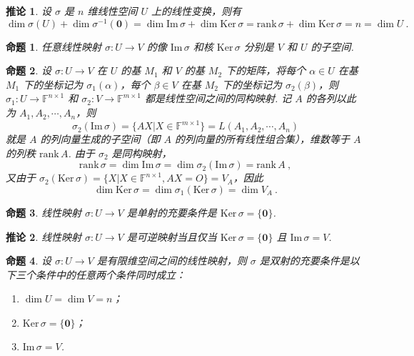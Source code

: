 \documentclass[zihao=-4,UTF8,linespread=1.8,nothm]{aytony_base}
\newtheorem{proposition}{\indent 命题}[subsection]
\newtheorem*{corollary}{\indent 推论}
\begin{document}
\begin{corollary}
    设 $\sigma$ 是 $n$ 维线性空间 $U$ 上的线性变换，则有 $$
        \dim \sigma(U) + \dim \sigma^{-1}(\mathbf{0}) = \dim \mathrm{Im}\,\sigma + \dim \mathrm{Ker}\,\sigma = \mathrm{rank}\,\sigma + \dim \mathrm{Ker}\,\sigma = n = \dim U\ .
    $$
\end{corollary}

\begin{proposition}
    任意线性映射 $\sigma: U \to V$ 的像 $\mathrm{Im}\,\sigma$ 和核 $\mathrm{Ker}\,\sigma$ 分别是 $V$ 和 $U$ 的子空间.
\end{proposition}

\begin{proposition}
    设 $\sigma: U \to V$ 在 $U$ 的基 $M_1$ 和 $V$ 的基 $M_2$ 下的矩阵，将每个 $\alpha \in U$ 在基 $M_1$ 下的坐标记为 $\sigma_1(\alpha)$，每个 $\beta \in V$ 在基 $M_2$ 下的坐标记为 $\sigma_2(\beta)$，则 $\sigma_1:U \to \mathbb{F}^{n \times 1}$ 和 $\sigma_2:V \to \mathbb{F}^{m \times 1}$ 都是线性空间之间的同构映射. 记 $A$ 的各列以此为 ${A}_1, {A}_2, \cdots, {A}_{n}$，则 $$
        \sigma_2(\mathrm{Im}\,\sigma) = \{AX|X \in \mathbb{F}^{m \times 1}\} = L({A}_1, {A}_2, \cdots, {A}_{n})
    $$ 就是 $A$ 的列向量生成的子空间（即 $A$ 的列向量的所有线性组合集），维数等于 $A$ 的列秩 $\mathrm{rank}\,A$. 由于 $\sigma_2$ 是同构映射，$$
        \mathrm{rank}\,\sigma = \dim \mathrm{Im}\,\sigma = \dim \sigma_2(\mathrm{Im}\,\sigma) = \mathrm{rank}\,A\ ,
    $$ 又由于 $\sigma_2(\mathrm{Ker}\,\sigma) = \{X|X \in \mathbb{F}^{n \times 1}, AX = O\} = V_{A}$，因此 $$
        \dim \mathrm{Ker}\,\sigma = \dim \sigma_1(\mathrm{Ker}\,\sigma) = \dim V_A\ .
    $$
\end{proposition}

\begin{proposition}
    线性映射 $\sigma: U \to V$ 是单射的充要条件是 $\mathrm{Ker}\,\sigma = \{\mathbf{0}\}$.
\end{proposition}

\begin{corollary}
    线性映射 $\sigma:U \to V$ 是可逆映射当且仅当 $\mathrm{Ker}\,\sigma = \{\mathbf{0}\}$ 且 $\mathrm{Im}\,\sigma = V$.
\end{corollary}

\begin{proposition}
    设 $\sigma: U \to V$ 是有限维空间之间的线性映射，则 $\sigma$ 是双射的充要条件是以下三个条件中的任意两个条件同时成立：
    \begin{enumerate}[nosep]
        \item $\dim U = \dim V = n$；
        \item $\mathrm{Ker}\,\sigma = \{\mathbf{0}\}$；
        \item $\mathrm{Im}\,\sigma = V$.
    \end{enumerate}
\end{proposition}
\end{document}
